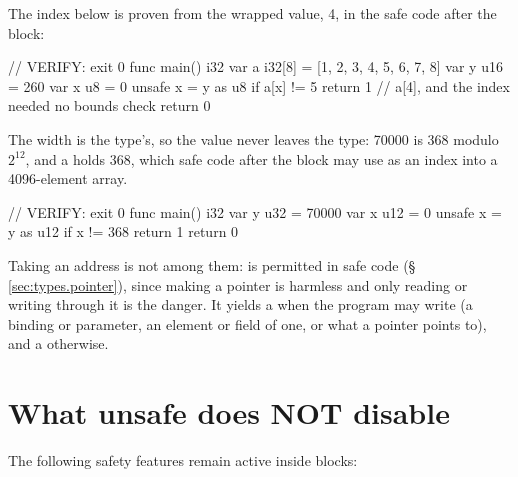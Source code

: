 \pnum
The index below is proven from the wrapped value, 4, in the safe code after the block:

\begin{laincode}
// VERIFY: exit 0
func main() i32 {
    var a i32[8] = [1, 2, 3, 4, 5, 6, 7, 8]
    var y u16 = 260
    var x u8 = 0
    unsafe {
        x = y as u8
    }
    if a[x] != 5 { return 1 }    // a[4], and the index needed no bounds check
    return 0
}
\end{laincode}

\pnum
The width is the type's, so the value never leaves the type: 70000 is 368 modulo $2^{12}$, and a
 holds 368, which safe code after the block may use as an index into a 4096-element
array.

\begin{laincode}
// VERIFY: exit 0
func main() i32 {
    var y u32 = 70000
    var x u12 = 0
    unsafe {
        x = y as u12
    }
    if x != 368 { return 1 }
    return 0
}
\end{laincode}

\pnum
Taking an address is not among them:  is permitted in safe code
(\S\,\ref{sec:types.pointer}), since making a pointer is harmless and only reading or
writing through it is the danger.  It yields a  when the program may write
 (a  binding or parameter, an element or field of one, or what a
 pointer points to), and a  otherwise.

\section{What unsafe does NOT disable}
\label{sec:unsafe.not-disabled}

\pnum
The following safety features remain active inside  blocks:

